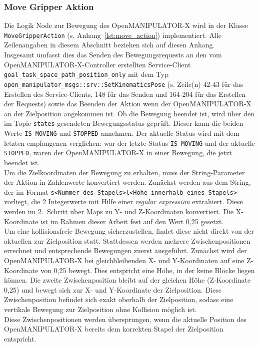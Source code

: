 \subsubsection{Move Gripper Aktion}
Die Logik Node zur Bewegung des OpenMANIPULATOR-X wird in der Klasse\\\verb|MoveGripperAction| (s. Anhang~\ref{lst:move_action}) implementiert.
Alle Zeilenangaben in diesem Abschnitt beziehen sich auf diesen Anhang.\\
Insgesamt umfasst dies das Senden des Bewegungsrequests an den vom OpenMANIPULATOR-X-Controller erstellten Service-Client \verb|goal_task_space_path_position_only| mit dem Typ \verb|open_manipulator_msgs::srv::SetKinematicsPose| (s. Zeile(n) 42-43 für das Erstellen des Service-Clients, 148 für das Senden und 164-204 für das Erstellen der Requests) sowie das Beenden der Aktion wenn der OpenMANIPULATOR-X an der Zielposition angekommen ist.
Ob die Bewegung beendet ist, wird über den im Topic \verb|states| gesendeten Bewegungsstatus geprüft.
Dieser kann die beiden Werte \verb|IS_MOVING| und \verb|STOPPED| annehmen.
Der aktuelle Status wird mit dem letzten empfangenen verglichen: war der letzte Status \verb|IS_MOVING| und der aktuelle \verb|STOPPED|, waren der OpenMANIPULATOR-X in einer Bewegung, die jetzt beendet ist.\\
Um die Zielkoordinaten der Bewegung zu erhalten, muss der String-Parameter der Aktion in Zahlenwerte konvertiert werden.
Zunächst werden aus dem String, der im Format \verb|s<Nummer des Stapels>l<Höhe innerhalb eines Stapels>| vorliegt, die 2 Integerwerte mit Hilfe einer \emph{regular expression} extrahiert.
Diese werden im 2.\ Schritt über Maps zu Y- und Z-Koordinaten konvertiert.
Die X-Koordinate ist im Rahmen dieser Arbeit fest auf den Wert 0,25 gesetzt.\\
Um eine kollisionsfreie Bewegung sicherzustellen, findet diese nicht direkt von der aktuellen zur Zielposition statt.
Stattdessen werden mehrere Zwischenpositionen errechnet und entsprechende Bewegungen zuerst ausgeführt.
Zunächst wird der OpenMANIPULATOR-X bei gleichbleibenden X- und Y-Koordinaten auf eine Z-Koordinate von 0,25 bewegt.
Dies entspricht eine Höhe, in der keine Blöcke liegen können.
Die zweite Zwischenposition bleibt auf der gleichen Höhe (Z-Koordinate 0,25) und bewegt sich zur X- und Y-Koordinate der Zielposition.
Diese Zwischenposition befindet sich exakt oberhalb der Zielposition, sodass eine vertikale Bewegung zur Zielposition ohne Kollision möglich ist.\\
Diese Zwischenpositionen werden übersprungen, wenn die aktuelle Position des OpenMANIPULATOR-X bereits dem korrekten Stapel der Zielposition entspricht.
